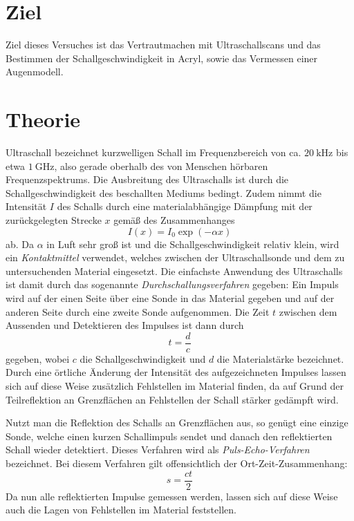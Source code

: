 \section{Ziel}
\label{sec:ziel}
Ziel dieses Versuches ist das Vertrautmachen mit Ultraschallscans und das Bestimmen der Schallgeschwindigkeit in Acryl, sowie das Vermessen einer Augenmodell.


\section{Theorie}
\label{sec:Theorie}

Ultraschall bezeichnet kurzwelligen Schall im Frequenzbereich von ca. $\SI{20}{\kilo \hertz}$ bis etwa $\SI{1}{\giga \hertz}$, also gerade oberhalb des von Menschen hörbaren Frequenzspektrums.
Die Ausbreitung des Ultraschalls ist durch die Schallgeschwindigkeit des beschallten Mediums bedingt. Zudem nimmt die Intensität $I$ des Schalls durch eine materialabhängige Dämpfung mit der zurückgelegten Strecke $x$ gemäß des Zusammenhanges
\begin{equation}
  I(x) = I_0 \exp{\left(-\alpha x \right)}
  \label{eqn:I}
\end{equation}
ab. Da $\alpha$ in Luft sehr groß ist und die Schallgeschwindigkeit relativ klein, wird ein \textit{Kontaktmittel} verwendet, welches zwischen der Ultraschallsonde und dem zu untersuchenden Material eingesetzt.
Die einfachste Anwendung des Ultraschalls ist damit durch das sogenannte \textit{Durchschallungsverfahren} gegeben: Ein Impuls wird auf der einen Seite über eine Sonde in das Material gegeben und auf der anderen Seite durch eine zweite Sonde aufgenommen. Die Zeit $t$ zwischen dem Aussenden und Detektieren des Impulses ist dann durch
\begin{equation}
  t = \frac{d}{c}
  \label{eqn:durch}
\end{equation}
gegeben, wobei $c$ die Schallgeschwindigkeit und $d$ die Materialstärke bezeichnet. Durch eine örtliche Änderung der Intensität des aufgezeichneten Impulses lassen sich auf diese Weise zusätzlich Fehlstellen im Material finden, da auf Grund der Teilreflektion an Grenzflächen an Fehlstellen der Schall stärker gedämpft wird.

Nutzt man die Reflektion des Schalls an Grenzflächen aus, so genügt eine einzige Sonde, welche einen kurzen Schallimpuls sendet und danach den reflektierten Schall wieder detektiert. Dieses Verfahren wird als \textit{Puls-Echo-Verfahren} bezeichnet. Bei diesem Verfahren gilt offensichtlich der Ort-Zeit-Zusammenhang:
\begin{equation}
  s = \frac{ct}{2}
  \label{eqn:echo}
\end{equation}
Da nun alle reflektierten Impulse gemessen werden, lassen sich auf diese Weise auch die Lagen von Fehlstellen im Material feststellen.

